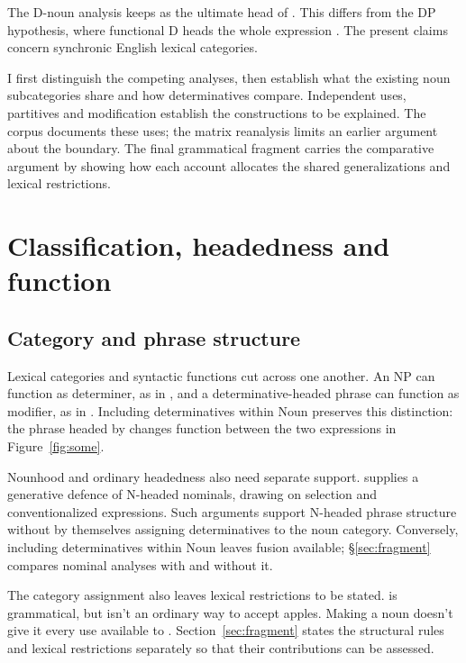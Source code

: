 \documentclass[12pt]{article}
\begin{document}
The D-noun analysis keeps  as the ultimate head of . This differs from the DP hypothesis, where functional D heads the whole expression \citep{abney1987}. The present claims concern synchronic English lexical categories.

I first distinguish the competing analyses, then establish what the existing noun subcategories share and how determinatives compare. Independent uses, partitives and modification establish the constructions to be explained. The corpus documents these uses; the matrix reanalysis limits an earlier argument about the boundary. The final grammatical fragment carries the comparative argument by showing how each account allocates the shared generalizations and lexical restrictions.

\section{Classification, headedness and function}\label{sec:alternatives}

\subsection{Category and phrase structure}

Lexical categories and syntactic functions cut across one another. An NP can function as determiner, as in , and a determinative-headed phrase can function as modifier, as in  \citep{payne2010,pullummiller2022nps}. Including determinatives within Noun preserves this distinction: the phrase headed by  changes function between the two expressions in Figure~\ref{fig:some}.

Nounhood and ordinary headedness also need separate support. \textcite{bruening2020nominal} supplies a generative defence of N-headed nominals, drawing on selection and conventionalized expressions. Such arguments support N-headed phrase structure without by themselves assigning determinatives to the noun category. Conversely, including determinatives within Noun leaves fusion available; §\ref{sec:fragment} compares nominal analyses with and without it.

The category assignment also leaves lexical restrictions to be stated.  is grammatical, but  isn't an ordinary way to accept apples. Making  a noun doesn't give it every use available to . Section~\ref{sec:fragment} states the structural rules and lexical restrictions separately so that their contributions can be assessed.
\end{document}
